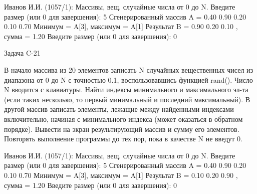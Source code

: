 Иванов И.И. (1057/1): Массивы, вещ. случайные числа от 0 до N.
Введите размер (или 0 для завершения): 5
Сгенерированный массив A = { 0.40 0.90 0.20 0.10 0.70 }
Минимум = A[3], максимум = A[1]
Результат B = { 0.90 0.20 0.10 }, сумма = 1.20
Введите размер (или 0 для завершения): 0


Задача C-21

В начало массива из 20 элементов записать N случайных вещественных чисел из
диапазона от 0 до N с точностью 0.1, воспользовавшись функцией rand(). Число N
вводится с клавиатуры. Найти индексы минимального и максимального эл-та (если
таких несколько, то первый минимальный и последний максимальный). В другой
массив записать элементы, лежащие между найденными индексами включительно,
начиная с минимального индекса (может оказаться в обратном порядке). Вывести
на экран результирующий массив и сумму его элементов. Повторять выполнение
программы до тех пор, пока в качестве N не введут 0.

Иванов И.И. (1057/1): Массивы, вещ. случайные числа от 0 до N.
Введите размер (или 0 для завершения): 5
Сгенерированный массив A = { 0.40 0.90 0.20 0.10 0.70 }
Минимум = A[3], максимум = A[1]
Результат B = { 0.10 0.20 0.90 }, сумма = 1.20
Введите размер (или 0 для завершения): 0


